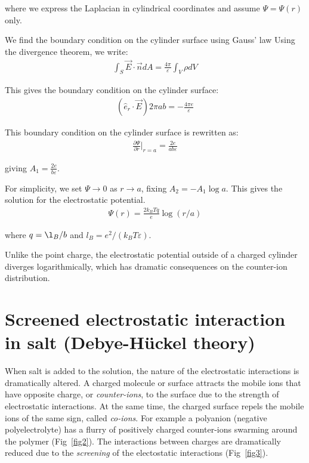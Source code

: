 \documentclass[book.tex]{subfiles}
\begin{document}
\noindent where we express the Laplacian in cylindrical coordinates and assume $\Psi = \Psi(r)$ only.

We find the boundary condition on the cylinder surface using Gauss' law Using the divergence theorem, we write:
\begin{align}\label{Eq10}
\int_S \vec{E}\cdot \vec{n}dA = \frac{4\pi}{\varepsilon}\int_V \rho dV
\end{align}

This gives the boundary condition on the cylinder surface:
\begin{align}\label{Eq11}
\left( \hat{e}_r \cdot\vec{E} \right) 2\pi ab=-\frac{4\pi e}{\varepsilon}
\end{align}

This boundary condition on the cylinder surface is rewritten as:
\begin{align}\label{Eq12}
\frac{\partial \Psi}{\partial r}\bigg|_{r=a} = \frac{2e}{ab\varepsilon}
\end{align}

\noindent giving $A_1=\frac{2e}{b\varepsilon}$.

For simplicity, we set $\Psi\rightarrow 0$ as $r\rightarrow a$, fixing $A_2 = -A_1 \log a$. This gives the solution for the electrostatic potential.
\begin{align}\label{Eq13}
\Psi(r) = \frac{2k_BTq}{e}\log\left(r/a\right)
\end{align}

\noindent where $q = \l_B/b$ and $l_B = e^2/(k_BT\varepsilon)$.

Unlike the point charge, the electrostatic potential outside of a charged cylinder diverges logarithmically, which has dramatic consequences on the counter-ion distribution.

\section{Screened electrostatic interaction in salt (Debye-H{\"u}ckel theory)}

When salt is added to the solution, the nature of the electrostatic
interactions is dramatically altered. A charged molecule or surface attracts the mobile ions that have opposite charge, or \textit{counter-ions}, to the surface due to the strength of electrostatic interactions. At the same time, the charged surface repels the mobile ions of the same sign, called \textit{co-ions}. For example a polyanion (negative polyelectrolyte) has a flurry of positively charged counter-ions swarming around the polymer (Fig~\ref{fig2}). The interactions between charges are dramatically reduced due to the \textit{screening} of the electostatic interactions (Fig~\ref{fig3}).
\end{document}
